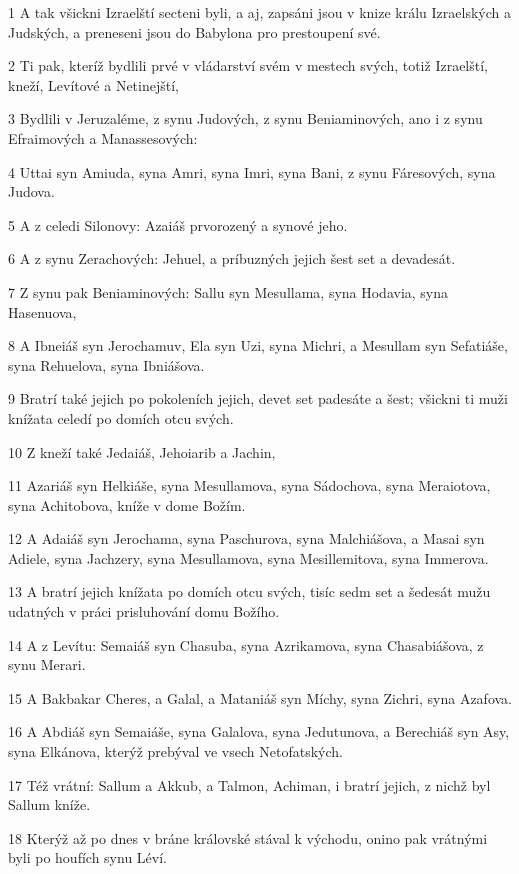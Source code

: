 \par 1 A tak všickni Izraelští secteni byli, a aj, zapsáni jsou v knize králu Izraelských a Judských, a preneseni jsou do Babylona pro prestoupení své.
\par 2 Ti pak, kteríž bydlili prvé v vládarství svém v mestech svých, totiž Izraelští, kneží, Levítové a Netinejští,
\par 3 Bydlili v Jeruzaléme, z synu Judových, z synu Beniaminových, ano i z synu Efraimových a Manassesových:
\par 4 Uttai syn Amiuda, syna Amri, syna Imri, syna Bani, z synu Fáresových, syna Judova.
\par 5 A z celedi Silonovy: Azaiáš prvorozený a synové jeho.
\par 6 A z synu Zerachových: Jehuel, a príbuzných jejich šest set a devadesát.
\par 7 Z synu pak Beniaminových: Sallu syn Mesullama, syna Hodavia, syna Hasenuova,
\par 8 A Ibneiáš syn Jerochamuv, Ela syn Uzi, syna Michri, a Mesullam syn Sefatiáše, syna Rehuelova, syna Ibniášova.
\par 9 Bratrí také jejich po pokoleních jejich, devet set padesáte a šest; všickni ti muži knížata celedí po domích otcu svých.
\par 10 Z kneží také Jedaiáš, Jehoiarib a Jachin,
\par 11 Azariáš syn Helkiáše, syna Mesullamova, syna Sádochova, syna Meraiotova, syna Achitobova, kníže v dome Božím.
\par 12 A Adaiáš syn Jerochama, syna Paschurova, syna Malchiášova, a Masai syn Adiele, syna Jachzery, syna Mesullamova, syna Mesillemitova, syna Immerova.
\par 13 A bratrí jejich knížata po domích otcu svých, tisíc sedm set a šedesát mužu udatných v práci prisluhování domu Božího.
\par 14 A z Levítu: Semaiáš syn Chasuba, syna Azrikamova, syna Chasabiášova, z synu Merari.
\par 15 A Bakbakar Cheres, a Galal, a Mataniáš syn Míchy, syna Zichri, syna Azafova.
\par 16 A Abdiáš syn Semaiáše, syna Galalova, syna Jedutunova, a Berechiáš syn Asy, syna Elkánova, kterýž prebýval ve vsech Netofatských.
\par 17 Též vrátní: Sallum a Akkub, a Talmon, Achiman, i bratrí jejich, z nichž byl Sallum kníže.
\par 18 Kterýž až po dnes v bráne královské stával k východu, onino pak vrátnými byli po houfích synu Léví.

